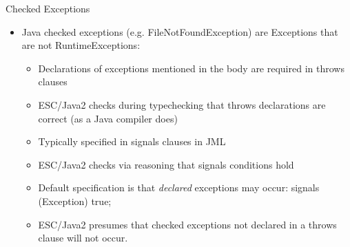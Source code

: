 \documentclass[
pdf,
nocolorBG,
slideColor,
cok,
]{prosper}
\begin{document}
\begin{slide}{Checked Exceptions}
\vspace*{-6ex}
\begin{itemize}
\item Java {\knalblue checked} exceptions (e.g. FileNotFoundException) are Exceptions that are not RuntimeExceptions:
\begin{itemize}
\item Declarations of exceptions mentioned in the body are required in throws clauses
\item ESC/Java2 checks during typechecking that throws declarations are correct (as a Java compiler does)
\item Typically specified in signals clauses in JML
\item ESC/Java2 checks via reasoning that signals conditions hold
\item Default specification is that \textit{declared} exceptions may occur:  signals (Exception) true;
\item ESC/Java2 presumes that checked exceptions not declared in a throws clause will not occur.
\end{itemize}
\end{itemize}
\end{slide}
\end{document}
